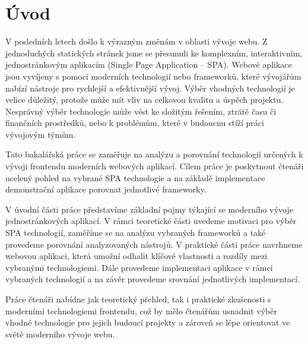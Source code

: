 \section*{Úvod}

V posledních letech došlo k výrazným změnám v oblasti vývoje webu. 
Z jednoduchých statických stránek jsme se přesunuli ke komplexním, interaktivním, jednostránkovým aplikacím (Single Page Application -- SPA). 
Webové aplikace jsou vyvíjeny s pomocí moderních technologií nebo frameworků, které vývojářům nabízí nástroje pro rychlejší a efektivnější vývoj. 
Výběr vhodných technologií je velice důležitý, protože může mít vliv na celkovou kvalitu a úspěch projektu. 
Nesprávný výběr technologie může vést ke složitým řešením, ztrátě času či finančních prostředků, nebo k problémům, které v budoucnu stíží práci vývojovým týmům.

Tato bakalářská práce se zaměřuje na analýzu a porovnání technologií určených k vývoji frontendu moderních webových aplikací. 
Cílem práce je poskytnout čtenáři ucelený pohled na vybrané SPA technologie a na základě implementace demonstrační aplikace porovnat jednotlivé frameworky.

V úvodní části práce představíme základní pojmy týkající se moderního vývoje jednostránkových aplikací. 
V rámci teoretické části uvedeme motivaci pro výběr SPA technologií, zaměříme se na analýzu vybraných frameworků a také provedeme porovnání analyzovaných nástrojů. 
V praktické části práce navrhneme webovou aplikaci, která umožní odhalit klíčové vlastnosti a rozdíly mezi vybranými technologiemi. 
Dále provedeme implementaci aplikace v rámci vybraných technologií a na závěr provedeme srovnání jednotlivých implementací.

Práce čtenáři nabídne jak teoretický přehled, tak i praktické zkušenosti s moderními technologiemi frontendu, 
což by mělo čtenářům usnadnit výběr vhodné technologie pro jejich budoucí projekty a zároveň se lépe orientovat ve světě moderního vývoje webu.



